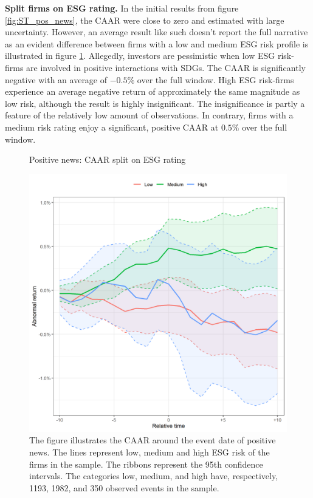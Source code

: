 \noindent \textbf{Split firms on ESG rating.}
In the initial results from figure \ref{fig:ST_pos_news}, the CAAR were close to zero and estimated with large uncertainty. However, an average result like such doesn't report the full narrative as an evident difference between firms with a low and medium ESG risk profile is illustrated in figure  \ref{fig:ST_pos_ESG}. Allegedly, investors are pessimistic when low ESG risk-firms are involved in positive interactions with SDGs. The CAAR is significantly negative with an average of $-0.5\%$ over the full window. High ESG risk-firms experience an average negative return of approximately the same magnitude as low risk, although the result is highly insignificant. The insignificance is partly a feature of the relatively low amount of observations. In contrary, firms with a medium risk rating enjoy a significant, positive CAAR at $0.5\%$ over the full window. 

\begin{figure} [H]
    \centering
    \caption{Positive news: CAAR split on ESG rating}
    \includegraphics[scale=0.6]{Projekt/1.Figures analysis/ST_positive_ESG.png}
     \caption*{\footnotesize The figure illustrates the CAAR around the event date of positive news. The lines represent low, medium and high ESG risk of the firms in the sample. The ribbons represent the 95th confidence intervals. The categories low, medium, and high have, respectively, 1193, 1982, and 350 observed events in the sample.  }
    \label{fig:ST_pos_ESG}
\end{figure} 

